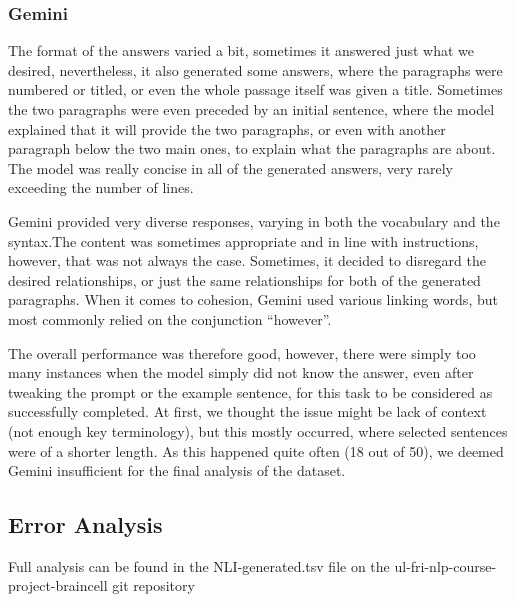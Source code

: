 \documentclass[fleqn,moreauthors,10pt]{ds_report}
\begin{document}
\subsubsection*{Gemini}
The format of the answers varied a bit, sometimes it answered just what we desired, nevertheless, it also generated some answers, where the paragraphs were numbered or titled, or even the whole passage itself was given a title. Sometimes the two paragraphs were even preceded by an initial sentence, where the model explained that it will provide the two paragraphs, or even with another paragraph below the two main ones, to explain what the paragraphs are about. The model was really concise in all of the generated answers, very rarely exceeding the number of lines.

Gemini provided very diverse responses, varying in both the vocabulary and the syntax.The content was sometimes appropriate and in line with instructions, however, that was not always the case. Sometimes, it decided to disregard the desired relationships, or just the same relationships for both of the generated paragraphs. When it comes to cohesion, Gemini used various linking words, but most commonly relied on the conjunction “however”.

The overall performance was therefore good, however, there were simply too many instances when the model simply did not know the answer, even after tweaking the prompt or the example sentence, for this task to be considered as successfully completed. At first, we thought the issue might be lack of context (not enough key terminology), but this mostly occurred, where selected sentences were of a shorter length. As this happened quite often (18 out of 50), we deemed Gemini insufficient for the final analysis of the dataset.


\subsection*{Error Analysis}
Full analysis can be found in the NLI-generated.tsv file on the ul-fri-nlp-course-project-braincell git repository
\end{document}
